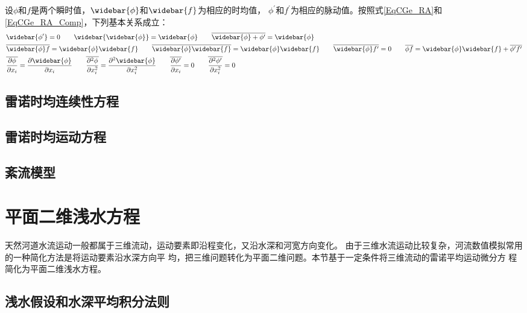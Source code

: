 设$\phi$和$f$是两个瞬时值，$\widebar{\phi}$和$\widebar{f}$为相应的时均值，
$\phi^{\prime}$和$f^{\prime}$为相应的脉动值。按照式\eqref{EqCGe_RA}和
\eqref{EqCGe_RA_Comp}，下列基本关系成立：
\begin{equation}
  \begin{aligned}
  &\widebar{\phi^{\prime}} = 0
  \quad\quad
  \widebar{\widebar{\phi}} = \widebar{\phi}
  \quad\quad
  \overline{\widebar{\phi}+\phi^{\prime}} = \widebar{\phi}
  \\
  & \overline{\widebar{\phi}f} = \widebar{\phi}\widebar{f}
  \quad\quad
  \overline{\widebar{\phi}\widebar{f}} = \widebar{\phi}\widebar{f}
  \quad\quad
  \overline{\widebar{\phi}f^{\prime}} = 0
  \quad\quad
  \overline{\phi f} = \widebar{\phi}\widebar{f} +
  \overline{\phi^{\prime}f^{\prime}}
  \\
  & \overline{\frac{\partial\phi}{\partial x_{i}}} = \frac{\partial \widebar{\phi}}{\partial x_{i}}
  \quad\quad
  \overline{\frac{\partial^{2}\phi}{\partial x_{i}^{2}}} = \frac{\partial^{2}
  \widebar{\phi}}{\partial x_{i}^{2}}
  \quad\quad
  \overline{\frac{\partial\phi^{\prime}}{\partial x_{i}}} = 0
  \quad\quad
  \overline{\frac{\partial^{2}\phi^{\prime}}{\partial x_{i}^{2}}} = 0
\end{aligned}
\end{equation}

\subsection{雷诺时均连续性方程}
\subsection{雷诺时均运动方程}
\subsection{紊流模型}

\section{平面二维浅水方程}
天然河道水流运动一般都属于三维流动，运动要素即沿程变化，又沿水深和河宽方向变化。
由于三维水流运动比较复杂，河流数值模拟常用的一种简化方法是将运动要素沿水深方向平
均，把三维问题转化为平面二维问题。本节基于一定条件将三维流动的雷诺平均运动微分方
程简化为平面二维浅水方程。
\subsection{浅水假设和水深平均积分法则}

